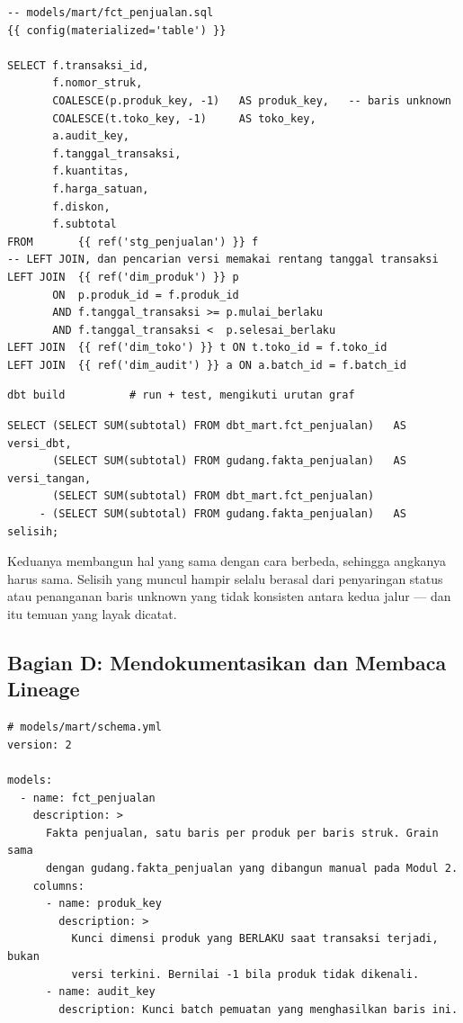 \begin{lstlisting}[style=sqlgaya]
-- models/mart/fct_penjualan.sql
{{ config(materialized='table') }}

SELECT f.transaksi_id,
       f.nomor_struk,
       COALESCE(p.produk_key, -1)   AS produk_key,   -- baris unknown
       COALESCE(t.toko_key, -1)     AS toko_key,
       a.audit_key,
       f.tanggal_transaksi,
       f.kuantitas,
       f.harga_satuan,
       f.diskon,
       f.subtotal
FROM       {{ ref('stg_penjualan') }} f
-- LEFT JOIN, dan pencarian versi memakai rentang tanggal transaksi
LEFT JOIN  {{ ref('dim_produk') }} p
       ON  p.produk_id = f.produk_id
       AND f.tanggal_transaksi >= p.mulai_berlaku
       AND f.tanggal_transaksi <  p.selesai_berlaku
LEFT JOIN  {{ ref('dim_toko') }} t ON t.toko_id = f.toko_id
LEFT JOIN  {{ ref('dim_audit') }} a ON a.batch_id = f.batch_id
\end{lstlisting}

\begin{lstlisting}[style=shellgaya]
dbt build          # run + test, mengikuti urutan graf
\end{lstlisting}


\begin{lstlisting}[style=sqlgaya]
SELECT (SELECT SUM(subtotal) FROM dbt_mart.fct_penjualan)   AS versi_dbt,
       (SELECT SUM(subtotal) FROM gudang.fakta_penjualan)   AS versi_tangan,
       (SELECT SUM(subtotal) FROM dbt_mart.fct_penjualan)
     - (SELECT SUM(subtotal) FROM gudang.fakta_penjualan)   AS selisih;
\end{lstlisting}

Keduanya membangun hal yang sama dengan cara berbeda, sehingga angkanya harus
sama. Selisih yang muncul hampir selalu berasal dari penyaringan status atau
penanganan baris unknown yang tidak konsisten antara kedua jalur --- dan itu
temuan yang layak dicatat.

\subsection{Bagian D: Mendokumentasikan dan Membaca Lineage}


\begin{lstlisting}[style=yamlgaya]
# models/mart/schema.yml
version: 2

models:
  - name: fct_penjualan
    description: >
      Fakta penjualan, satu baris per produk per baris struk. Grain sama
      dengan gudang.fakta_penjualan yang dibangun manual pada Modul 2.
    columns:
      - name: produk_key
        description: >
          Kunci dimensi produk yang BERLAKU saat transaksi terjadi, bukan
          versi terkini. Bernilai -1 bila produk tidak dikenali.
      - name: audit_key
        description: Kunci batch pemuatan yang menghasilkan baris ini.
\end{lstlisting}


